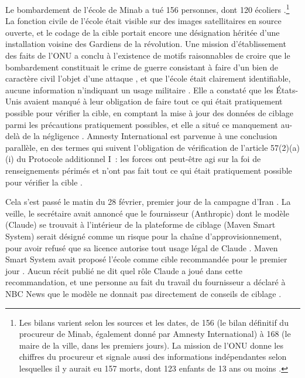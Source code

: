 Le bombardement de l'école de Minab a tué 156 personnes, dont 120 écoliers \autocite[par.~92]{UNFFMIran2026}.\footnote{Les bilans varient selon les sources et les dates, de 156 (le bilan définitif du procureur de Minab, également donné par Amnesty International) à 168 (le maire de la ville, dans les premiers jours). La mission de l'ONU donne les chiffres du procureur et signale aussi des informations indépendantes selon lesquelles il y aurait eu 157 morts, dont 123 enfants de 13 ans ou moins \autocite[par.~92–93]{UNFFMIran2026}.} La fonction civile de l'école était visible sur des images satellitaires en source ouverte, et le codage de la cible portait encore une désignation héritée d'une installation voisine des Gardiens de la révolution. Une mission d'établissement des faits de l'ONU a conclu à l'existence de motifs raisonnables de croire que le bombardement constituait le crime de guerre consistant à faire d'un bien de caractère civil l'objet d'une attaque \autocite{ohchr2026minabpress}, et que l'école était clairement identifiable, aucune information n'indiquant un usage militaire \autocite[par.~81–86, 124–126]{UNFFMIran2026}. Elle a constaté que les États-Unis avaient manqué à leur obligation de faire tout ce qui était pratiquement possible pour vérifier la cible, en comptant la mise à jour des données de ciblage parmi les précautions pratiquement possibles, et elle a situé ce manquement au-delà de la négligence \autocite[par.~124–125]{UNFFMIran2026}. Amnesty International est parvenue à une conclusion parallèle, en des termes qui suivent l'obligation de vérification de l'article 57(2)(a)(i) du Protocole additionnel I~: les forces ont peut-être agi sur la foi de renseignements périmés et n'ont pas fait tout ce qui était pratiquement possible pour vérifier la cible \autocite{Amnesty2026Minab}.

Cela s'est passé le matin du 28 février, premier jour de la campagne d'Iran \autocite{Amnesty2026Minab,crs2026iranwar}. La veille, le secrétaire avait annoncé que le fournisseur (Anthropic) dont le modèle (Claude) se trouvait à l'intérieur de la plateforme de ciblage (Maven Smart System) serait désigné comme un risque pour la chaîne d'approvisionnement, pour avoir refusé que sa licence autorise tout usage légal de Claude \autocite{npr2026openai}. Maven Smart System avait proposé l'école comme cible recommandée pour le premier jour \autocite{livingstone2026maven,gizmodo2026minab}. Aucun récit publié ne dit quel rôle Claude a joué dans cette recommandation, et une personne au fait du travail du fournisseur a déclaré à NBC News que le modèle ne donnait pas directement de conseils de ciblage \autocite{nbc2026targeting}.

